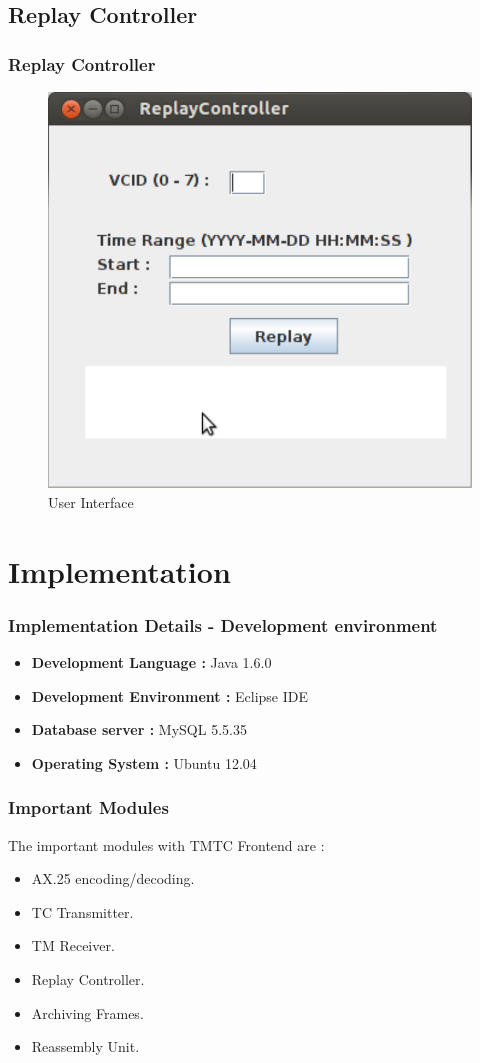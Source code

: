 \documentclass{beamer}
\begin{document}
\subsection{Replay Controller}
\begin{frame}
\frametitle{Replay Controller}
\begin{figure}
\includegraphics[scale = 0.4 ]{replay.pdf}
\caption{User Interface}
\label{fig1:replay}
\end{figure}
\end{frame}

\section{Implementation}
\begin{frame}
\frametitle{Implementation Details - Development environment}
\begin{itemize}
\item \textbf{Development Language : } Java 1.6.0
\item \textbf{Development Environment : } Eclipse IDE
\item \textbf{Database server : } MySQL 5.5.35
\item \textbf{Operating System : }Ubuntu 12.04
\end{itemize} 
\end{frame}

\begin{frame}
\frametitle{Important Modules}
The important modules with TMTC Frontend are :
\begin{itemize}
\item AX.25 encoding/decoding.
\item TC Transmitter.
\item TM Receiver.
\item Replay Controller.
\item Archiving Frames.
\item Reassembly Unit.
\end{itemize}
\end{frame}
\end{document}
